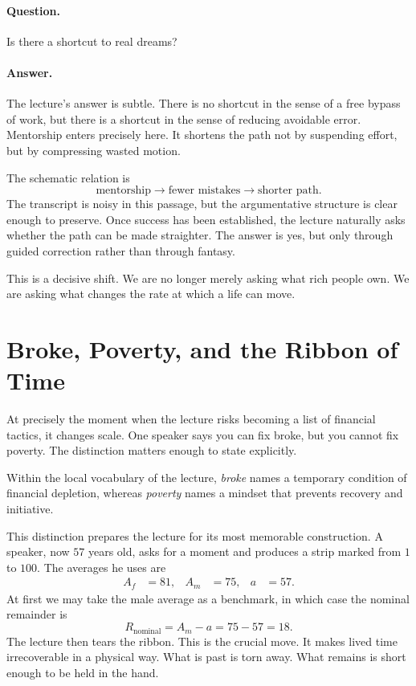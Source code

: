 \paragraph{Question.} Is there a shortcut to real dreams?

\paragraph{Answer.} The lecture's answer is subtle. There is no shortcut in the sense of a free bypass of work, but there is a shortcut in the sense of reducing avoidable error. Mentorship enters precisely here. It shortens the path not by suspending effort, but by compressing wasted motion.

The schematic relation is
\begin{equation}
\text{mentorship} \rightarrow \text{fewer mistakes} \rightarrow \text{shorter path}.
\end{equation}
The transcript is noisy in this passage, but the argumentative structure is clear enough to preserve. Once success has been established, the lecture naturally asks whether the path can be made straighter. The answer is yes, but only through guided correction rather than through fantasy.

This is a decisive shift. We are no longer merely asking what rich people own. We are asking what changes the rate at which a life can move.

\section{Broke, Poverty, and the Ribbon of Time}

At precisely the moment when the lecture risks becoming a list of financial tactics, it changes scale. One speaker says you can fix broke, but you cannot fix poverty. The distinction matters enough to state explicitly.

\begin{definition}
Within the local vocabulary of the lecture, \emph{broke} names a temporary condition of financial depletion, whereas \emph{poverty} names a mindset that prevents recovery and initiative.
\end{definition}

This distinction prepares the lecture for its most memorable construction. A speaker, now \(57\) years old, asks for a moment and produces a strip marked from \(1\) to \(100\). The averages he uses are
\begin{align}
A_f &= 81, &
A_m &= 75, &
a &= 57.
\end{align}
At first we may take the male average as a benchmark, in which case the nominal remainder is
\begin{equation}
R_{\text{nominal}}=A_m-a=75-57=18.
\end{equation}
The lecture then tears the ribbon. This is the crucial move. It makes lived time irrecoverable in a physical way. What is past is torn away. What remains is short enough to be held in the hand.

